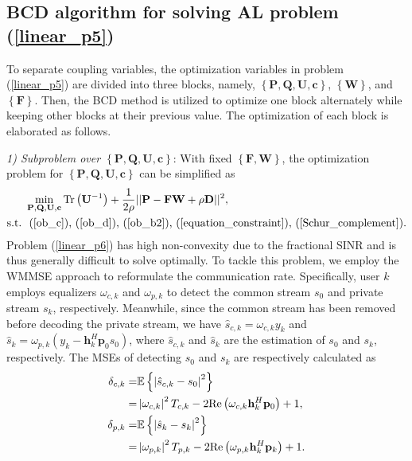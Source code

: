 \documentclass[10pt,journal,twocolumn]{IEEEtran}
\begin{document}
\subsection{ BCD algorithm for solving AL problem (\ref{linear_p5})}
To separate coupling variables, the optimization variables in problem (\ref{linear_p5}) are divided into three blocks, namely, $\left\{\mathbf{P},\mathbf{Q},\mathbf{U},\mathbf{c}\right\}$, $\left\{\mathbf{W}\right\}$, and $\left\{\mathbf{F}\right\}$. Then, the BCD method is utilized to optimize one block alternately while keeping other blocks at their previous value\cite{10587118}. The optimization of each block is elaborated as follows.

\emph{1) Subproblem over $\left\{\mathbf{P},\mathbf{Q},\mathbf{U},\mathbf{c}\right\}$}: With fixed $\left\{\mathbf{F},\mathbf{W}\right\}$, the optimization problem for $\left\{\mathbf{P},\mathbf{Q},\mathbf{U},\mathbf{c}\right\}$ can be simplified as
\begin{subequations}\label{linear_p6}
	\begin{align}
&\min_{\mathbf{P},\mathbf{Q},\mathbf{U},\mathbf{c} } \text{Tr}\left(\mathbf{U}^{-1}\right)+\frac{1}{2\rho}||\mathbf{P}-\mathbf{FW} +\rho\mathbf{D}||^2,\label{ob_a6}\\
	\text{s.t.}~
  &\mbox{ (\ref{ob_c}),~(\ref{ob_d}),~(\ref{ob_b2}),~(\ref{equation_constraint}),~(\ref{Schur_complement})}.\label{ob_b6}
	\end{align}
\end{subequations} 
Problem (\ref{linear_p6}) has high non-convexity due to the fractional SINR and is thus generally difficult to solve optimally. To tackle this problem, we employ the WMMSE approach to reformulate the communication rate. Specifically, user $k$ employs equalizers $\omega_{c,k}$ and $\omega_{p,k}$ to detect the common stream $s_0$ and private stream $s_k$, respectively. Meanwhile, since the common stream has been removed before decoding the private stream, we have $\hat{s}_{c,k}=\omega_{c,k}y_k$ and $\hat{s}_{k}=\omega_{p,k}\left(y_k-\mathbf{h}^H_k\mathbf{p}_0s_0\right)$, where $\hat s_{c,k}$ and $\hat{s}_{k}$ are the estimation of $s_0$ and $s_k$, respectively. The MSEs of detecting $s_0$ and $s_k$ are respectively calculated as 
\begin{subequations}\label{MMSE_error}
\begin{align}
\delta_{c,k} = &\mathbb{E}\left\{\left|\hat{s}_{c,k}-s_{0}\right|^2\right\}\notag\\=&\left|\omega_{c,k}\right|^2T_{c,k}-2\text{Re}\left(\omega_{c,k}\mathbf{h}^H_k\mathbf{p}_0\right)+1,\\
\delta_{p,k} = &\mathbb{E}\left\{\left|\hat{s}_{k}-s_{k}\right|^2\right\}\notag\\=&\left|\omega_{p,k}\right|^2T_{p,k}-2\text{Re}\left(\omega_{p,k}\mathbf{h}^H_k\mathbf{p}_k\right)+1.
\end{align}
\end{subequations}
\end{document}
